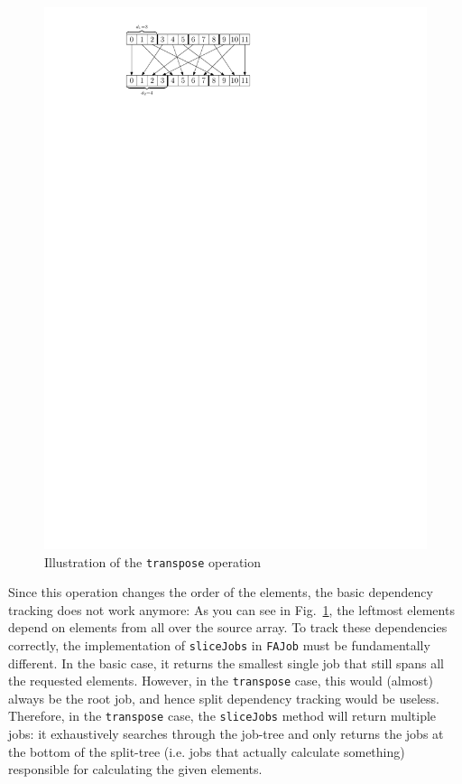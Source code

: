 \documentclass[runningheads,a4paper,fleqn]{llncs}
\begin{document}
\begin{figure}
\centering
\includegraphics{transpose}
\caption{Illustration of the \texttt{transpose} operation}
\label{fig:transpose}
\end{figure}

Since this operation changes the order of the elements, the basic
dependency tracking does not work anymore: As you can see in
Fig.~\ref{fig:transpose}, the leftmost elements depend on elements from
all over the source array. To track these dependencies correctly, the
implementation of \texttt{sliceJobs} in \texttt{FAJob} must be
fundamentally different. In the 
basic case, it returns the smallest single job that still spans all
the requested elements. However, in the \texttt{transpose} case, this
would (almost)
always be the root job, and hence split dependency tracking would
be useless. Therefore,
in the \texttt{transpose} case, the \texttt{sliceJobs} method will
return multiple jobs: it exhaustively searches through the job-tree
and only returns the jobs at the bottom of the split-tree (i.e. jobs
that actually calculate something) responsible for calculating the
given elements.
\end{document}
